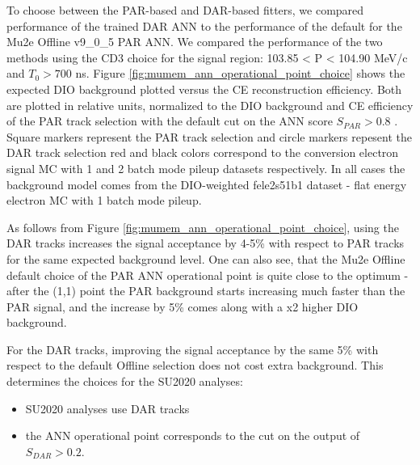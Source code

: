 To choose between the PAR-based and DAR-based fitters, we compared performance of the
trained DAR ANN to the performance of the default for the  {\blue Mu2e Offline} v9\_0\_5  PAR ANN.
%
{\blue We compared the performance of the two methods using the CD3 choice for the signal region: 103.85 < P < 104.90 MeV/c and $T_0 > 700$ ns.}
%
Figure \ref{fig:mumem_ann_operational_point_choice} shows the expected DIO background plotted
versus the CE reconstruction efficiency. Both are plotted in relative units, normalized
to the DIO background and CE efficiency of the PAR track selection with the default
cut on the ANN score $S_{PAR} > 0.8$ .
%
 {\blue Square markers} represent {\blue the} PAR track selection
{\blue and circle markers repesent the} DAR track selection\strike{,}{\blue ;} red and black colors
correspond to the  {\blue conversion electron signal MC with 1 and 2} batch mode pileup
 datasets  {\blue respectively}.
%
In all cases the background model comes from the DIO-weighted fele2s51b1 dataset -
 {\blue flat energy electron MC with} 1 batch {\blue mode} pileup. 

As follows from Figure \ref{fig:mumem_ann_operational_point_choice}, 
{\blue using the DAR tracks increases the signal acceptance by 4-5\% with respect to PAR tracks for the same expected  background level.}
One can also see, that the {\blue Mu2e Offline default} choice of the PAR ANN operational point is quite close to the optimum - after the 
(1,1) point the PAR background starts increasing much faster than the PAR signal,
and the increase by 5\% comes along with  {\blue a} x2 higher DIO background.

For the DAR tracks, improving the signal acceptance by the same 5\%  {\blue with respect to} the default 
{\blue Offline} selection  {\blue does not} cost extra background. This determines the choices for {\blue the} SU2020 analyses: 

\begin{itemize}
\item
  SU2020 analyses use DAR tracks
\item
  the ANN operational point corresponds to the cut on the output of $S_{DAR} > 0.2$.
\end{itemize}

